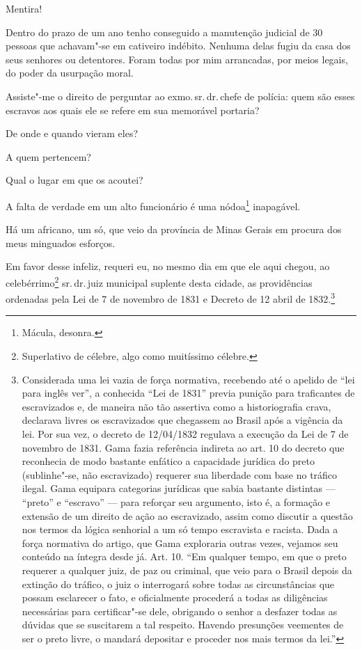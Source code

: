 Mentira!

Dentro do prazo de um ano tenho conseguido a manutenção judicial de 30
pessoas que achavam"-se em cativeiro indébito. Nenhuma delas fugiu da
casa dos seus senhores ou detentores. Foram todas por mim arrancadas,
por meios legais, do poder da usurpação moral.

Assiste"-me o direito de perguntar ao exmo.\,sr.\,dr.\,chefe de polícia:
quem são esses escravos aos quais ele se refere em sua memorável
portaria?

De onde e quando vieram eles?

A quem pertencem?

Qual o lugar em que os acoutei?

A falta de verdade em um alto funcionário é uma nódoa\footnote{Mácula,
  desonra.} inapagável.

Há um africano, um só, que veio da província de Minas Gerais em procura
dos meus minguados esforços.

Em favor desse infeliz, requeri eu, no mesmo dia em que ele aqui chegou,
ao celebérrimo\footnote{Superlativo de célebre, algo como muitíssimo \label{celebre}
  célebre.} sr.\,dr.\,juiz municipal suplente desta cidade, as
providências ordenadas pela Lei de 7 de novembro de 1831 e Decreto de 12
abril de 1832.\footnote{Considerada uma lei vazia de força normativa,
  recebendo até o apelido de ``lei para inglês ver'', a conhecida ``Lei de
  1831'' previa punição para traficantes de escravizados e, de maneira
  não tão assertiva como a historiografia crava, declarava livres os
  escravizados que chegassem ao Brasil após a vigência da lei. Por sua
  vez, o decreto de 12/04/1832 regulava a execução da Lei de 7 de
  novembro de 1831. Gama fazia referência indireta ao art.
  10 do decreto que reconhecia de modo bastante enfático a capacidade
  jurídica do preto (sublinhe"-se, não escravizado) requerer sua
  liberdade com base no tráfico ilegal. Gama equipara categorias
  jurídicas que sabia bastante distintas --- ``preto'' e ``escravo'' --- para
  reforçar seu argumento, isto é, a formação e extensão de um direito de
  ação ao escravizado, assim como discutir a questão nos termos da
  lógica senhorial a um só tempo escravista e racista. Dada a força
  normativa do artigo, que Gama exploraria outras vezes, vejamos seu conteúdo na
  íntegra desde já. Art. 10. ``Em qualquer tempo, em que o preto requerer
  a qualquer juiz, de paz ou criminal, que veio para o Brasil depois da
  extinção do tráfico, o juiz o interrogará sobre todas as
  circunstâncias que possam esclarecer o fato, e oficialmente procederá
  a todas as diligências necessárias para certificar"-se dele, obrigando
  o senhor a desfazer todas as dúvidas que se suscitarem a tal respeito.
  Havendo presunções veementes de ser o preto livre, o mandará depositar
  e proceder nos mais termos da lei.''}

